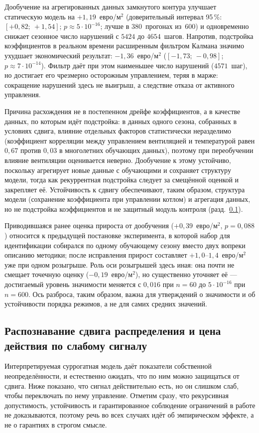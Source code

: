 \documentclass[12pt,a4paper,leqno]{article}
\begin{document}
Дообучение на агрегированных данных замкнутого контура улучшает статическую модель на
$+1{,}19$~евро/м$^2$ (доверительный интервал 95\,\%: $[+0{,}82;\ +1{,}54]$;
$p\approx5\cdot10^{-16}$; лучше в 380~прогонах из~600) и одновременно снижает сезонное
число нарушений с $5424$ до $4654$~шагов. Напротив, подстройка коэффициентов в реальном
времени расширенным фильтром Калмана значимо ухудшает экономический результат:
$-1{,}36$~евро/м$^2$ ($[-1{,}73;\ -0{,}98]$; $p\approx7\cdot10^{-14}$). Фильтр даёт при
этом наименьшее число нарушений ($4571$~шаг), но достигает его чрезмерно осторожным
управлением, теряя в марже: сокращение нарушений здесь не выигрыш, а следствие отказа от
активного управления.

Причина расхождения не в постепенном дрейфе коэффициентов, а в качестве данных, по
которым идёт подстройка: в данных одного сезона, собранных в условиях сдвига, влияние
отдельных факторов статистически неразделимо (коэффициент корреляции между управлением
вентиляцией и температурой равен $0{,}67$ против $0{,}03$ в многолетних обучающих
данных), поэтому при переобучении влияние вентиляции оценивается неверно. Дообучение к
этому устойчиво, поскольку агрегирует новые данные с обучающими и сохраняет структуру
модели, тогда как рекуррентная подстройка следует за смещённой оценкой и закрепляет её.
Устойчивость к сдвигу обеспечивают, таким образом, структура модели (сохранение
коэффициента при управлении котлом) и агрегация данных, но не подстройка коэффициентов
и не защитный модуль контроля (разд.~\ref{sec:safety}).

Приводившаяся ранее оценка прироста от дообучения ($+0{,}39$~евро/м$^2$, $p=0{,}088$)
относится к предыдущей постановке эксперимента, в которой набор для идентификации
собирался по одному обучающему сезону вместо двух вопреки описанию методики; после
исправления прирост составляет $+1{,}0$--$1{,}4$~евро/м$^2$ уже при одном розыгрыше.
Роль оси розыгрышей здесь иная: она почти не смещает точечную оценку
($-0{,}19$~евро/м$^2$), но существенно уточняет её — достигаемый уровень значимости
меняется с $0{,}016$ при $n=60$ до $5\cdot10^{-16}$ при $n=600$. Ось разброса, таким
образом, важна для утверждений о значимости и об устойчивости порядка режимов, а не для
самих средних значений.

\subsection{Распознавание сдвига распределения и цена действия по слабому сигналу}
\label{sec:safety}
Интерпретируемая суррогатная модель даёт показатели собственной неопределённости, и
естественно ожидать, что по ним можно защищаться от сдвига. Ниже показано, что сигнал
действительно есть, но он слишком слаб, чтобы переключать по нему управление. Отметим
сразу, что рекурсивная допустимость, устойчивость и гарантированное соблюдение
ограничений в работе не доказываются, поэтому речь во всех случаях идёт об эмпирическом
эффекте, а не о гарантиях в строгом смысле.
\end{document}
